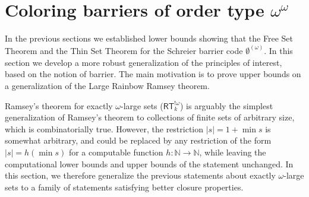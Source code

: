 \documentclass{article}
\newcommand{\RT}[0]{\mathsf{RT}}
\newcommand{\NN}[0]{\mathbb{N}}
\numberwithin{theorem}{section}
\newcommand{\ludovic}[1]{\textcolor{blue}{#1}}
\newcommand{\lorenzo}[1]{\textcolor{orange}{#1}}
\begin{document}
\section{Coloring barriers of order type $\omega^\omega$}\label{sec:coloring-barriers}

In the previous sections we established lower bounds showing that the Free Set Theorem and the Thin Set Theorem for the Schreier barrier code $\emptyset^{(\omega)}$. In this section we develop a more robust generalization of the principles of interest, based on the notion of barrier. The main motivation is to prove upper bounds on a generalization of the Large Rainbow Ramsey theorem. %

Ramsey's theorem for exactly $\omega$-large sets ($\RT^{!\omega}_k$) is arguably the simplest generalization of Ramsey's theorem to collections of finite sets of arbitrary size, which is combinatorially true. However, %
the restriction $|s| = 1+\min s$ is somewhat arbitrary, and could be replaced by any restriction of the form $|s| = h(\min s)$ for a computable function $h : \NN \to \NN$, while leaving the computational lower bounds and upper bounds of the statement unchanged. 
In this section, we therefore generalize the previous statements about exactly $\omega$-large sets to a family of statements satisfying better closure properties.
\end{document}
